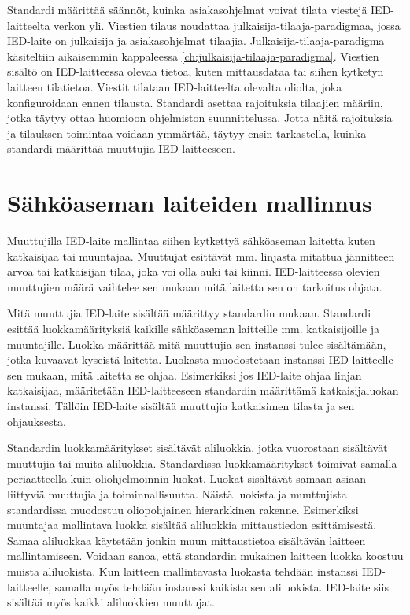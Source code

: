 Standardi määrittää säännöt, kuinka asiakasohjelmat voivat tilata viestejä IED-laitteelta verkon yli. Viestien tilaus noudattaa julkaisija-tilaaja-paradigmaa, jossa IED-laite on julkaisija ja asiakasohjelmat tilaajia. Julkaisija-tilaaja-paradigma käsiteltiin aikaisemmin kappaleessa \ref{ch:julkaisija-tilaaja-paradigma}. Viestien sisältö on IED-laitteessa olevaa tietoa, kuten mittausdataa tai siihen kytketyn laitteen tilatietoa. Viestit tilataan IED-laitteelta olevalta oliolta, joka konfiguroidaan ennen tilausta. Standardi asettaa rajoituksia tilaajien määriin, jotka täytyy ottaa huomioon ohjelmiston suunnittelussa. Jotta näitä rajoituksia ja tilauksen toimintaa voidaan ymmärtää, täytyy ensin tarkastella, kuinka standardi määrittää muuttujia IED-laitteeseen. \mbox{\cite[s.~91--97]{IEC61850-7-2}}


\section{Sähköaseman laiteiden mallinnus}
Muuttujilla IED-laite mallintaa siihen kytkettyä sähköaseman laitetta kuten katkaisijaa tai muuntajaa. Muuttujat esittävät mm. linjasta mitattua jännitteen arvoa tai katkaisijan tilaa, joka voi olla auki tai kiinni. IED-laitteessa olevien muuttujien määrä vaihtelee sen mukaan mitä laitetta sen on tarkoitus ohjata. \cite[s.~28]{IEC61850-7-1}

Mitä muuttujia IED-laite sisältää määrittyy standardin mukaan. Standardi esittää luokkamäärityksiä kaikille sähköaseman laitteille mm. katkaisijoille ja muuntajille. Luokka määrittää mitä muuttujia sen instanssi tulee sisältämään, jotka kuvaavat kyseistä laitetta. Luokasta muodostetaan instanssi IED-laitteelle sen mukaan, mitä laitetta se ohjaa. Esimerkiksi jos IED-laite ohjaa linjan katkaisijaa, määritetään IED-laitteeseen standardin määrittämä katkaisijaluokan instanssi. Tällöin IED-laite sisältää muuttujia katkaisimen tilasta ja sen ohjauksesta. \cite{IEC61850-7-3, IEC61850-7-4}

Standardin luokkamääritykset sisältävät aliluokkia, jotka vuorostaan sisältävät muuttujia tai muita aliluokkia. Standardissa luokkamääritykset toimivat samalla periaatteella kuin oliohjelmoinnin luokat. Luokat sisältävät samaan asiaan liittyviä muuttujia ja toiminnallisuutta. Näistä luokista ja muuttujista standardissa muodostuu oliopohjainen hierarkkinen rakenne. Esimerkiksi muuntajaa mallintava luokka sisältää aliluokkia mittaustiedon esittämisestä. Samaa aliluokkaa käytetään jonkin muun mittaustietoa sisältävän laitteen mallintamiseen. Voidaan sanoa, että standardin mukainen laitteen luokka koostuu muista aliluokista. Kun laitteen mallintavasta luokasta tehdään instanssi IED-laitteelle, samalla myös tehdään instanssi kaikista sen aliluokista. IED-laite siis sisältää myös kaikki aliluokkien muuttujat. \mbox{\cite[s.~108]{IEC61850-7-1}}

